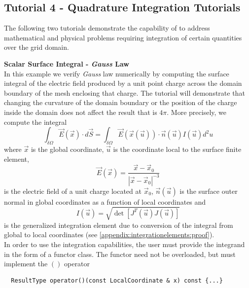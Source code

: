 \subsection{Tutorial 4 - Quadrature Integration Tutorials}
\label{usage-howto-tutorial-integration-quadrature}

The following two tutorials demonstrate the capability of \curvgrid{} to address mathematical and physical problems requiring integration of certain quantities over the grid domain.


\noindent
\textbf{Scalar Surface Integral - \textit{Gauss} Law} \\
%
\noindent
In this example we verify \textit{Gauss} law numerically by computing the surface integral of the electric field produced by a unit point charge across the domain boundary of the mesh enclosing that charge. The tutorial will demonstrate that changing the curvature of the domain boundary or the position of the charge inside the domain does not affect the result that is $4 \pi$. More precisely, we compute the integral
\[\int_{\delta \Omega} \vec{E}(\vec{x}) \cdot d\vec{S} = \int_{\delta \Omega} \vec{E}(\vec{x}(\vec{u})) \cdot \vec{n}(\vec{u}) I(\vec{u}) d^2 u \]
\noindent
where $\vec{x}$ is the global coordinate, $\vec{u}$ is the coordinate local to the surface finite element,
\[\vec{E}(\vec{x}) = \frac{\vec{x} - \vec{x}_0}{|\vec{x} - \vec{x}_0|^{-3}}\]
is the electric field of a unit charge located at $\vec{x}_0$, $\vec{n}(\vec{u})$ is the surface outer normal in global coordinates as a function of local coordinates and
\[I(\vec{u}) = \sqrt{\det [ J^T(\vec{u}) J(\vec{u}) ]}\]
is the generalized integration element due to conversion of the integral from global to local coordinates (see \cref{appendix:integrationelements:proof}). \\

\noindent
In order to use the \curvgeom{} integration capabilities, the user must provide the integrand in the form of a functor class. The functor need not be overloaded, but must implement the $()$ operator

\begin{mybox}
\begin{lstlisting}
  ResultType operator()(const LocalCoordinate & x) const {...}
\end{lstlisting}
\end{mybox}

